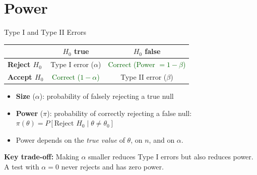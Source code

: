 \documentclass[handout, aspectratio=169]{beamer}
\numberwithin{equation}{section}
\begin{document}
\section{Power}
\setcounter{subsection}{1}

\begin{frame}{Type I and Type II Errors}

\begin{center}
\renewcommand{\arraystretch}{1.3}
\begin{tabular}{lcc}
\toprule
& \textbf{$H_0$ true} & \textbf{$H_0$ false} \\
\midrule
\textbf{Reject $H_0$} & Type I error ($\alpha$) & \textcolor{darkgreen}{Correct (Power $= 1 - \beta$)} \\
\textbf{Accept $H_0$} & \textcolor{darkgreen}{Correct ($1-\alpha$)} & Type II error ($\beta$) \\
\bottomrule
\end{tabular}
\end{center}

\pause

\begin{itemize}
\item \textbf{Size} ($\alpha$): probability of falsely rejecting a true null
\item \textbf{Power} ($\pi$): probability of correctly rejecting a false null: $\pi(\theta) = P[\text{Reject } H_0 \mid \theta \neq \theta_0]$
\item Power depends on the \emph{true value} of $\theta$, on $n$, and on $\alpha$.
\end{itemize}

\pause

\begin{tcolorbox}[colback=red!5, colframe=red!50]
\textbf{Key trade-off:} Making $\alpha$ smaller reduces Type I errors but also reduces power.  A test with $\alpha = 0$ never rejects and has zero power.
\end{tcolorbox}
\end{frame}
\end{document}
